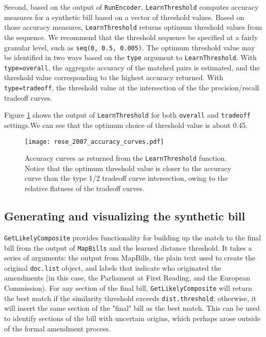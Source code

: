 \documentclass[11pt]{article}
\begin{document}
Second, based on the output of \texttt{RunEncoder},
\texttt{LearnThreshold} computes accuracy measures for a synthetic
bill based on a vector of threshold values. Based on those accuracy
measures, \texttt{LearnThreshold} returns optimum threshold values
from the sequence. We recommend that the
threshold sequence be specified at a fairly granular level, such as
\texttt{seq(0, 0.5, 0.005)}. The optimum threshold value may be identified in
two ways based on the \texttt{type} argument to
\texttt{LearnThreshold}. With \texttt{type=overall}, the aggregate
accuracy of the matched pairs is estimated, and the threshold value
corresponding to the highest accuracy returned. With
\texttt{type=tradeoff}, the threshold value at the intersection of the
the precision/recall tradeoff curves. 

Figure \ref{fig:learn-threshold-output} shows the
output of \texttt{LearnThreshold} for both \texttt{overall} and
\texttt{tradeoff} settings.We can see that the optimum choice of
threshold value is about 0.45.

\begin{figure}[ht]
  \centering
  \texttt{[image: rese\_2007\_accuracy\_curves.pdf]}
  \caption{Accuracy curves as returned from the \texttt{LearnThreshold} function. Notice that the optimum threshold value is closer to the accuracy curve than the type 1/2 tradeoff curve intersection, owing to the relative flatness of the tradeoff curves.}
  \label{fig:learn-threshold-output}
\end{figure}

\subsection{Generating and visualizing the synthetic bill}
\label{sec:gener-synth-bill}

\texttt{GetLikelyComposite} provides functionality for building up the
match to the final bill from the output of \texttt{MapBills} and the
learned distance threshold. It takes a series of arguments: the output
from MapBills, the plain text used to create the original
\texttt{doc.list} object, and labels that indicate who originated the
amendments (in this case, the Parliament at First Reading, and the
European Commission). For any section of the final bill,
\texttt{GetLikelyComposite} will return the best match if the
similarity threshold exceeds \texttt{dist.threshold}; otherwise, it
will insert the same section of the "final" bill as the best
match. This can be used to identify sections of the bill with
uncertain origins, which perhaps arose outside of the formal amendment
process.
\end{document}
